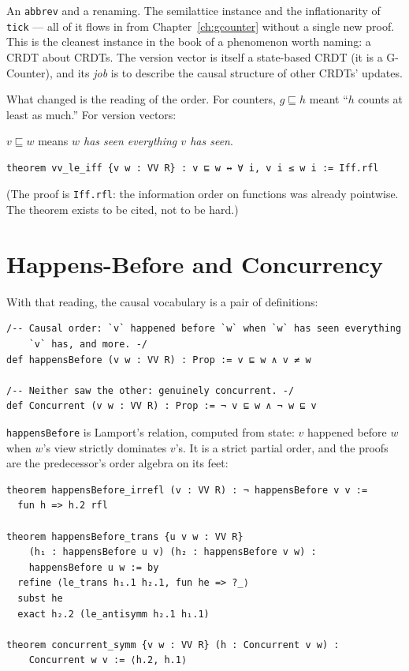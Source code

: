 \documentclass[12pt, a4paper, openright]{book}
\theoremstyle{thmstyle}
\theoremstyle{defstyle}
\newcommand{\lc}[1]{\texttt{#1}}
\begin{document}
An \lc{abbrev} and a renaming. The semilattice instance and the
inflationarity of \lc{tick} --- all of it
flows in from Chapter~\ref{ch:gcounter} without a single new proof. This
is the cleanest instance in the book of a phenomenon worth naming: a
CRDT about CRDTs. The version vector is itself a state-based CRDT (it is
a G-Counter), and its \emph{job} is to describe the causal structure of
other CRDTs' updates.

What changed is the reading of the order. For counters,
$g \sqsubseteq h$ meant ``$h$ counts at least as much.'' For version
vectors:

\medskip
$v \sqsubseteq w$ means \emph{$w$ has seen everything $v$ has seen}.
\medskip

\begin{verbatim}
theorem vv_le_iff {v w : VV R} : v ⊑ w ↔ ∀ i, v i ≤ w i := Iff.rfl
\end{verbatim}

(The proof is \lc{Iff.rfl}: the information order on functions was
already pointwise. The theorem exists to be cited, not to be hard.)

\section{Happens-Before and Concurrency}

With that reading, the causal vocabulary is a pair of definitions:

\begin{verbatim}
/-- Causal order: `v` happened before `w` when `w` has seen everything
    `v` has, and more. -/
def happensBefore (v w : VV R) : Prop := v ⊑ w ∧ v ≠ w

/-- Neither saw the other: genuinely concurrent. -/
def Concurrent (v w : VV R) : Prop := ¬ v ⊑ w ∧ ¬ w ⊑ v
\end{verbatim}

\lc{happensBefore} is Lamport's relation, computed from state:
$v$ happened before $w$ when $w$'s view strictly dominates $v$'s. It is
a strict partial order, and the proofs are the predecessor's order
algebra on its feet:

\begin{verbatim}
theorem happensBefore_irrefl (v : VV R) : ¬ happensBefore v v :=
  fun h => h.2 rfl

theorem happensBefore_trans {u v w : VV R}
    (h₁ : happensBefore u v) (h₂ : happensBefore v w) :
    happensBefore u w := by
  refine ⟨le_trans h₁.1 h₂.1, fun he => ?_⟩
  subst he
  exact h₂.2 (le_antisymm h₂.1 h₁.1)

theorem concurrent_symm {v w : VV R} (h : Concurrent v w) :
    Concurrent w v := ⟨h.2, h.1⟩
\end{verbatim}
\end{document}
